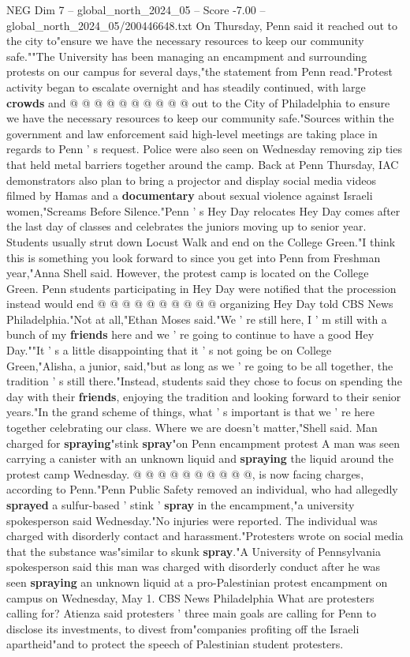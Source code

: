 \begin{textsample}{NEG Dim 7 – global\_north\_2024\_05 – Score -7.00 – global\_north\_2024\_05/200446648.txt}
On Thursday, Penn said it reached out to the city to"ensure we have the necessary resources to keep our community safe.""The University has been managing an encampment and surrounding protests on our campus for several days,"the statement from Penn read."Protest activity began to escalate overnight and has steadily continued, with large \textbf{crowds} and @ @ @ @ @ @ @ @ @ @ out to the City of Philadelphia to ensure we have the necessary resources to keep our community safe."Sources within the government and law enforcement said high-level meetings are taking place in regards to Penn ' s request.
Police were also seen on Wednesday removing zip ties that held metal barriers together around the camp.
Back at Penn Thursday, IAC demonstrators also plan to bring a projector and display social media videos filmed by Hamas and a \textbf{documentary} about sexual violence against Israeli women,"Screams Before Silence."Penn ' s Hey Day relocates Hey Day comes after the last day of classes and celebrates the juniors moving up to senior year.
Students usually strut down Locust Walk and end on the College Green."I think this is something you look forward to since you get into Penn from Freshman year,"Anna Shell said.
However, the protest camp is located on the College Green.
Penn students participating in Hey Day were notified that the procession instead would end @ @ @ @ @ @ @ @ @ @ organizing Hey Day told CBS News Philadelphia."Not at all,"Ethan Moses said."We ' re still here, I ' m still with a bunch of my \textbf{friends} here and we ' re going to continue to have a good Hey Day.""It ' s a little disappointing that it ' s not going be on College Green,"Alisha, a junior, said,"but as long as we ' re going to be all together, the tradition ' s still there."Instead, students said they chose to focus on spending the day with their \textbf{friends}, enjoying the tradition and looking forward to their senior years."In the grand scheme of things, what ' s important is that we ' re here together celebrating our class.
Where we are doesn't matter,"Shell said.
Man charged for \textbf{spraying}"stink \textbf{spray}"on Penn encampment protest A man was seen carrying a canister with an unknown liquid and \textbf{spraying} the liquid around the protest camp Wednesday. @ @ @ @ @ @ @ @ @ @, is now facing charges, according to Penn."Penn Public Safety removed an individual, who had allegedly \textbf{sprayed} a sulfur-based ' stink ' \textbf{spray} in the encampment,"a university spokesperson said Wednesday."No injuries were reported.
The individual was charged with disorderly contact and harassment."Protesters wrote on social media that the substance was"similar to skunk \textbf{spray}."A University of Pennsylvania spokesperson said this man was charged with disorderly conduct after he was seen \textbf{spraying} an unknown liquid at a pro-Palestinian protest encampment on campus on Wednesday, May 1.
CBS News Philadelphia What are protesters calling for?
Atienza said protesters ' three main goals are calling for Penn to disclose its investments, to divest from"companies profiting off the Israeli apartheid"and to protect the speech of Palestinian student protesters.


\end{textsample}

